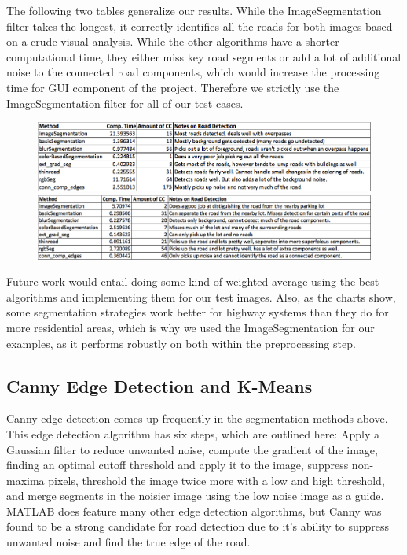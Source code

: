 \documentclass[12pt]{article}
\begin{document}
The following two tables generalize our results. While the ImageSegmentation filter takes the longest, it correctly identifies all the roads for both images based on a crude visual analysis. While the other algorithms have a shorter computational time, they either miss key road segments or add a lot of additional noise to the connected road components, which would increase the processing time for GUI component of the project. Therefore we strictly use the ImageSegmentation filter for all of our test cases. 

\begin{figure}[h!]
\centering
\includegraphics[scale = 0.4]{image1table.png}
\includegraphics[scale = 0.4]{image2table.png}
\end{figure}

Future work would entail doing some kind of weighted average using the best algorithms and implementing them for our test images. Also, as the charts show, some segmentation strategies work better for highway systems than they do for more residential areas, which is why we used the ImageSegmentation for our examples, as it performs robustly on both within the preprocessing step. 

\subsection*{Canny Edge Detection and K-Means}
Canny edge detection comes up frequently in the segmentation methods above. This edge detection algorithm has six steps, which are outlined here: Apply a Gaussian filter to reduce unwanted noise, compute the gradient of the image, finding an optimal cutoff threshold and apply it to the image, suppress non-maxima pixels, threshold the image twice more with a low and high threshold, and merge segments in the noisier image using the low noise image as a guide. MATLAB does feature many other edge detection algorithms, but Canny was found to be a strong candidate for road detection due to it's ability to suppress unwanted noise and find the true edge of the road. 
\end{document}
